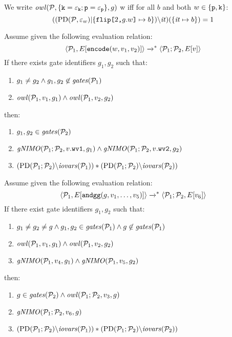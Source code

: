 \begin{definition}
  We write $\mathit{owl}(\mathcal{P}, \{ \texttt{k} = \varepsilon_{\texttt{k}}; \texttt{p} = \varepsilon_{\texttt{p}}\}, g)$
w  iff for all $b$ and both $w \in \{\texttt{p},\texttt{k}\}$:
  $$
  ((\mathrm{PD}(\mathcal{P},\varepsilon_{w})|\{ \texttt{flip[}2\texttt{,}g.w\texttt{]} \mapsto b \})\backslash\mathit{it})(\{ \mathit{it} \mapsto b\}) = 1
  $$
\end{definition}

\begin{lemma}
Assume given the following evaluation relation:
$$
\langle \mathcal{P}_1,E[\texttt{encode}(w,v_1,v_2)] \rangle \xrightarrow{}^{*} \langle \mathcal{P}_1;\mathcal{P}_2,E[v] \rangle
$$
If there exists gate identifiers $g_1, g_2$ such that:
\begin{enumerate}
  \item $g_1 \ne g_2 \wedge g_1,g_2 \not\in \mathit{gates}(\mathcal{P}_1)$
  \item $\mathit{owl}(\mathcal{P}_1,v_1,g_1) \wedge \mathit{owl}(\mathcal{P}_1,v_2,g_2)$
\end{enumerate}
then:
\begin{enumerate}
\item $g_1,g_2 \in  \mathit{gates}(\mathcal{P}_2)$
\item $\mathit{gNIMO}(\mathcal{P}_1;\mathcal{P}_2,v.\texttt{wv1},g_1) \wedge \mathit{gNIMO}(\mathcal{P}_1;\mathcal{P}_2,v.\texttt{wv2},g_2)$
\item $(\mathrm{PD}(\mathcal{P}_1;\mathcal{P}_2)\backslash\mathit{iovars}(\mathcal{P}_1)) * (\mathrm{PD}(\mathcal{P}_1;\mathcal{P}_2)\backslash\mathit{iovars}(\mathcal{P}_2))$
\end{enumerate}
\end{lemma}

\begin{lemma}
Assume given the following evaluation relation:
$$
\langle \mathcal{P}_1,E[\texttt{andgg}(g,v_1,\ldots,v_5)] \rangle \xrightarrow{}^{*} \langle \mathcal{P}_1;\mathcal{P}_2,E[v_6] \rangle
$$
If there exist gate identifiers $g_1, g_2$ such that:
\begin{enumerate}
  \item $g_1 \ne g_2 \ne g \wedge g_1,g_2 \in \mathit{gates}(\mathcal{P}_1) \wedge g \not\in \mathit{gates}(\mathcal{P}_1)$
  \item $\mathit{owl}(\mathcal{P}_1,v_1,g_1) \wedge \mathit{owl}(\mathcal{P}_1,v_2,g_2)$
  \item $\mathit{gNIMO}(\mathcal{P}_1,v_4,g_1) \wedge \mathit{gNIMO}(\mathcal{P}_1,v_5,g_2)$
\end{enumerate}
then:
\begin{enumerate}
  \item $g \in \mathit{gates}(\mathcal{P}_2) \wedge \mathit{owl}(\mathcal{P}_1;\mathcal{P}_2,v_3,g)$
  \item $\mathit{gNIMO}(\mathcal{P}_1;\mathcal{P}_2,v_6,g)$
  \item $(\mathrm{PD}(\mathcal{P}_1;\mathcal{P}_2)\backslash\mathit{iovars}(\mathcal{P}_1)) * (\mathrm{PD}(\mathcal{P}_1;\mathcal{P}_2)\backslash\mathit{iovars}(\mathcal{P}_2))$
\end{enumerate}
\end{lemma}

